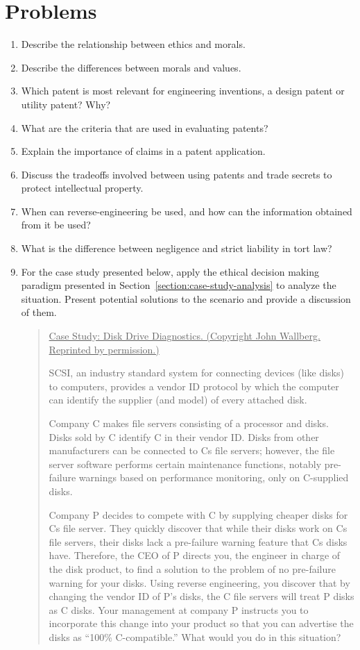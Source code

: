 \section{Problems}

\begin{enumerate}
\def\labelenumi{\arabic{enumi}.}
\item
  Describe the relationship between ethics and morals.
\item
  Describe the differences between morals and values.
\item
  Which patent is most relevant for engineering inventions, a design
  patent or utility patent? Why?
\item
  What are the criteria that are used in evaluating patents?
\item
  Explain the importance of claims in a patent application.
\item
  Discuss the tradeoffs involved between using patents and trade secrets
  to protect intellectual property.
\item
  When can reverse-engineering be used, and how can the information
  obtained from it be used?
\item
  What is the difference between negligence and strict liability in tort
  law?
\item
  For the case study presented below, apply the ethical decision making
  paradigm presented in Section~\ref{section:case-study-analysis} to 
analyze the situation. Present
  potential solutions to the scenario and provide a discussion of them.

\begin{quote}
\ul{\hfill\break
Case Study: Disk Drive Diagnostics. (Copyright John Wallberg. Reprinted
by permission.)}

SCSI, an industry standard system for connecting devices (like disks) to
computers, provides a vendor ID protocol by which the computer can
identify the supplier (and model) of every attached disk.

Company C makes file servers consisting of a processor and disks. Disks
sold by C identify C in their vendor ID. Disks from other manufacturers
can be connected to C\textquotesingle s file servers; however, the file
server software performs certain maintenance functions, notably
pre-failure warnings based on performance monitoring, only on C-supplied
disks.

Company P decides to compete with C by supplying cheaper disks for
C\textquotesingle s file server. They quickly discover that while their
disks work on C\textquotesingle s file servers, their disks lack a
pre-failure warning feature that C\textquotesingle s disks have.
Therefore, the CEO of P directs you, the engineer in charge of the disk
product, to find a solution to the problem of no pre-failure warning for
your disks. Using reverse engineering, you discover that by changing the
vendor ID of P's disks, the C file servers will treat P disks as C
disks. Your management at company P instructs you to incorporate this
change into your product so that you can advertise the disks as ``100\%
C-compatible.'' What would you do in this situation?
\end{quote}



\end{enumerate}
